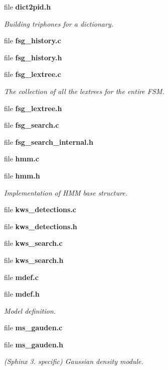 \begin{DoxyCompactItemize}
\begin{DoxyCompactList}
\begin{DoxyItemize}
\end{DoxyItemize}\end{DoxyCompactList}\item 
file {\bf dict2pid.\+h}
\begin{DoxyCompactList}\small\item\em Building triphones for a dictionary. \end{DoxyCompactList}\item 
file {\bfseries fsg\+\_\+history.\+c}
\item 
file {\bfseries fsg\+\_\+history.\+h}
\item 
file {\bf fsg\+\_\+lextree.\+c}
\begin{DoxyCompactList}\small\item\em The collection of all the lextrees for the entire F\+S\+M. \end{DoxyCompactList}\item 
file {\bfseries fsg\+\_\+lextree.\+h}
\item 
file {\bfseries fsg\+\_\+search.\+c}
\item 
file {\bfseries fsg\+\_\+search\+\_\+internal.\+h}
\item 
file {\bfseries hmm.\+c}
\item 
file {\bf hmm.\+h}
\begin{DoxyCompactList}\small\item\em Implementation of H\+M\+M base structure. \end{DoxyCompactList}\item 
file {\bfseries kws\+\_\+detections.\+c}
\item 
file {\bfseries kws\+\_\+detections.\+h}
\item 
file {\bfseries kws\+\_\+search.\+c}
\item 
file {\bfseries kws\+\_\+search.\+h}
\item 
file {\bfseries mdef.\+c}
\item 
file {\bf mdef.\+h}
\begin{DoxyCompactList}\small\item\em Model definition. \end{DoxyCompactList}\item 
file {\bfseries ms\+\_\+gauden.\+c}
\item 
file {\bf ms\+\_\+gauden.\+h}
\begin{DoxyCompactList}\small\item\em (Sphinx 3. specific) Gaussian density module. \end{DoxyCompactList}\item 

\end{DoxyCompactItemize}
